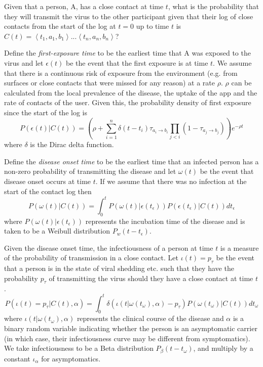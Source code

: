 \documentclass{article}
\begin{document}
Given that a person, A, has a close contact at time $t$, what is the probability that they will transmit the virus to the other participant given that their log of close contacts from the start of the log at $t=0$ up to time $t$ is $C(t) = \left< t_{1},a_1,b_1 \right> ... \left< t_{n},a_n,b_n \right>$?

Define the \textit{first-exposure time} to be the earliest time that A was exposed to the virus and let $\epsilon(t)$ be the event that the first exposure is at time $t$. We assume that there is a continuous risk of exposure from the environment (e.g. from surfaces or close contacts that were missed for any reason) at a rate $\rho$. $\rho$ can be calculated from the local prevalence of the disease, the uptake of the app and the rate of contacts of the user. Given this, the probability density of first exposure since the start of the log is
\[
P\left(\epsilon(t)|C(t)\right) = \left(\rho + \sum_{i=1}^n \delta(t - t_i)\tau_{a_i\rightarrow b_i} \prod_{j<i}(1-\tau_{a_j\rightarrow b_j})\right) e^{-\rho t}
\] 
where $\delta$ is the Dirac delta function.

Define the \textit{disease onset time} to be the earliest time that an infected person has a non-zero probability of transmitting the disease and let $\omega(t)$ be the event that disease onset occurs at time $t$. If we assume that there was no infection at the start of the contact log then
\[
P(\omega(t)|C(t)) = \int_0^{t} P(\omega(t)|\epsilon(t_\epsilon))P(\epsilon(t_\epsilon)|C(t)) dt_\epsilon
\]
where $P(\omega(t)|\epsilon(t_\epsilon))$ represents the incubation time of the disease and is taken to be a Weibull distribution $P_w(t-t_\epsilon)$.

Given the disease onset time, the infectiousness of a person at time $t$ is a measure of the probability of transmission in a close contact. Let $\iota(t) = p_\tau$ be the event that a person is in the state of viral shedding etc. such that they have the probability $p_\tau$ of transmitting the virus should they have a close contact at time $t$.
\[
P(\iota(t) = p_\tau|C(t),\alpha) = \int_0^t \delta(\iota(t|\omega(t_\omega),\alpha)-p_\tau)P(\omega(t_\omega)|C(t)) dt_\omega
\]
where $\iota(t|\omega(t_\omega),\alpha)$ represents the clinical course of the disease and $\alpha$ is a binary random variable indicating whether the person is an asymptomatic carrier (in which case, their infectiousness curve may be different from symptomatics). We take infectiousness to be a Beta distribution $P_\beta(t-t_\omega)$, and multiply by a constant $\iota_\alpha$ for asymptomatics.
\end{document}
